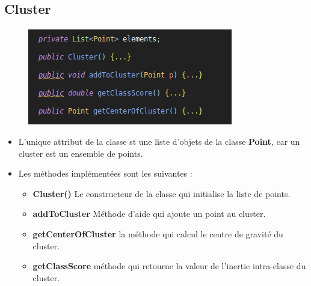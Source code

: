 	\subsection{Cluster}
		\paragraph{}
		\begin{figure}[H]
			\centering
			\includegraphics[width=0.75\linewidth]{dbscan/images/cluster/all.png}
		\end{figure}
		\begin{itemize}
			\item L'unique attribut de la classe st une liste d'objets de la classe \textbf{Point}, car un cluster est un ensemble de points.
			
			\item Les méthodes implémentées sont les suivantes : 
			\begin{itemize}
				\item \textbf{Cluster()} Le constructeur de la classe qui initialise la liste de points.
				\item \textbf{addToCluster} Méthode d'aide qui ajoute un point au cluster.
				\item \textbf{getCenterOfCluster} la méthode qui calcul le centre de gravité du cluster.
				\item \textbf{getClassScore} méthode qui retourne la valeur de l'inertie intra-classe du cluster.
			\end{itemize}
		\end{itemize}
	
